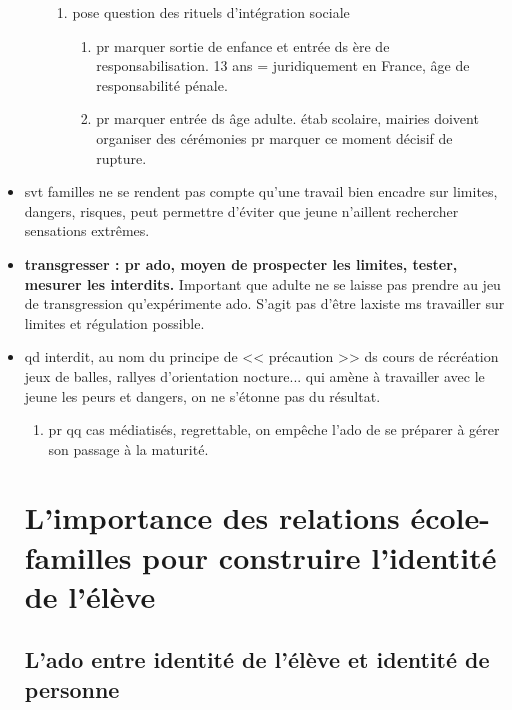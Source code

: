 \documentclass[12pt]{report}
\begin{document}
\begin{itemize}
\begin{enumerate}
\begin{enumerate}
\item pose question des rituels d'intégration sociale
\begin{enumerate}
\item pr marquer sortie de enfance et entrée ds ère de responsabilisation. 13 ans = juridiquement en France, âge de responsabilité pénale.
\item pr marquer entrée ds âge adulte. étab scolaire, mairies doivent organiser des cérémonies pr marquer ce moment décisif de rupture.
\end{enumerate}
\end{enumerate}
\end{enumerate}

\item svt familles ne se rendent pas compte qu'une travail bien encadre sur limites, dangers, risques, peut permettre d'éviter que jeune n'aillent rechercher sensations extrêmes.\\
\item \textbf{transgresser : pr ado, moyen de prospecter les limites, tester, mesurer les interdits.} Important que adulte ne se laisse pas prendre au jeu de transgression qu'expérimente ado. S'agit pas d'être laxiste ms travailler sur limites et régulation possible.\\

\item qd interdit, au nom du principe de << précaution >> ds cours de récréation jeux de balles, rallyes d'orientation nocture... qui amène à travailler avec le jeune les peurs et dangers, on ne s'étonne pas du résultat.
\begin{enumerate}
\item pr qq cas médiatisés, regrettable, on empêche l'ado de se préparer à gérer son passage à la maturité.\\
\end{enumerate}


\section{L'importance des relations école-familles pour construire l'identité de l'élève}

\subsection{L'ado entre identité de l'élève et identité de personne}

\end{itemize}
\end{document}
